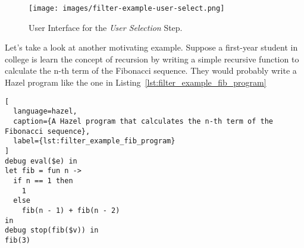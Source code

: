 \begin{figure}[h]
  \centering
  \texttt{[image: images/filter-example-user-select.png]}
  \caption{User Interface for the \emph{User Selection} Step.}\label{fig:simple_example_final_ui}
\end{figure}

Let's take a look at another motivating example. Suppose a first-year
student in college is learn the concept of recursion by writing a
simple recursive function to calculate the n-th term of the Fibonacci
sequence. They would probably write a Hazel program like the one in Listing~\ref{lst:filter_example_fib_program}

\begin{lstlisting}[
  language=hazel,
  caption={A Hazel program that calculates the n-th term of the Fibonacci sequence},
  label={lst:filter_example_fib_program}
]
debug eval($e) in
let fib = fun n ->
  if n == 1 then
    1
  else
    fib(n - 1) + fib(n - 2)
in
debug stop(fib($v)) in
fib(3)
\end{lstlisting}


